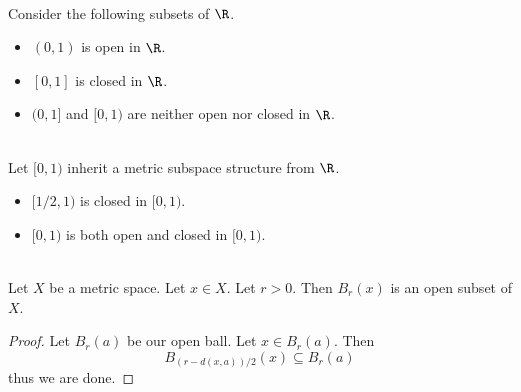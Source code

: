 \documentclass[a4paper]{article}
\begin{document}
\begin{eg}{}{}\\
Consider the following subsets of $\R$. 
\begin{itemize}
\item $(0,1)$ is open in $\R$. 
\item $[0,1]$ is closed in $\R$. 
\item $(0,1]$ and $[0,1)$ are neither open nor closed in $\R$. 
\end{itemize}
\end{eg}

\begin{eg}{}{}\\
Let $[0,1)$ inherit a metric subspace structure from $\R$. 
\begin{itemize}
\item $[1/2,1)$ is closed in $[0,1)$. 
\item $[0,1)$ is both open and closed in $[0,1)$. 
\end{itemize}
\end{eg}

\begin{lmm}{}{}\\
Let $X$ be a metric space. Let $x\in X$. Let $r>0$. Then $B_r(x)$ is an open subset of $X$. 
\begin{proof} Let $B_r(a)$ be our open ball. Let $x\in B_r(a)$. Then $$B_{(r-d(x,a))/2}(x)\subseteq B_r(a)$$ thus we are done. 
\end{proof}
\end{lmm}
\end{document}

